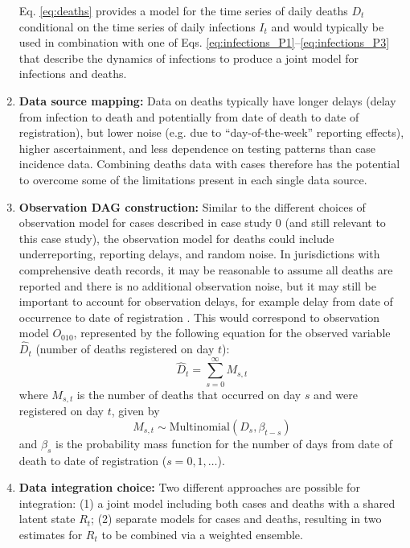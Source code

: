 \documentclass{article}
\begin{document}
\begin{enumerate}
    Eq. \eqref{eq:deaths} provides a model for the time series of daily deaths $D_t$ conditional on the time series of daily infections $I_t$ and would typically be used in combination with one of Eqs. \eqref{eq:infections_P1}--\eqref{eq:infections_P3} that describe the dynamics of infections to produce a joint model for infections and deaths. 
    \item \textbf{Data source mapping:} Data on deaths typically have longer delays (delay from infection to death and potentially from date of death to date of registration), but lower noise (e.g. due to ``day-of-the-week'' reporting effects), higher ascertainment, and less dependence on testing patterns than case incidence data. Combining deaths data with cases therefore has the potential to overcome some of the limitations present in each single data source. 
    \item \textbf{Observation DAG construction:} Similar to the different choices of observation model for cases described in case study 0 (and still relevant to this case study), the observation model for deaths could include underreporting, reporting delays, and random noise. In jurisdictions with comprehensive death records, it may be reasonable to assume all deaths are reported and there is no additional observation noise, but it may still be important to account for observation delays, for example delay from date of occurrence to date of registration \citep{seaman2022nowcasting}. 
    This would correspond to observation model $O_{010}$, represented by the following equation for the observed variable $\hat{D}_t$ (number of deaths registered on day $t$):
\begin{equation}
    \hat{D}_t = \sum_{s=0}^\infty M_{s,t}
\end{equation}
where $M_{s,t}$ is the number of deaths that occurred on day $s$ and were registered on day $t$, given by
\begin{equation}
    M_{s,t} \sim \mathrm{Multinomial}\left( D_s, \beta_{t-s}\right) 
\end{equation}
and $\beta_s$ is the probability mass function for the number of days from date of death to date of registration ($s=0,1,\ldots$).
    
    \item \textbf{Data integration choice:} 
       Two different approaches are possible for integration: (1) a joint model including both cases and deaths with a shared latent state $R_t$; (2) separate models for cases and deaths, resulting in two estimates for $R_t$ to be combined via a weighted ensemble. 
       

\end{enumerate}
\end{document}
